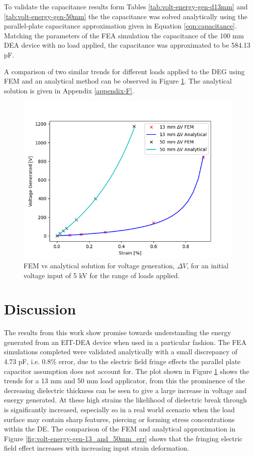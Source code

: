 To validate the capacitance results form Tables \ref{tab:volt-energy-gen-d13mm} and \ref{tab:volt-energy-gen-50mm} the the capacitance was solved analytically using the parallel-plate capacitance approximation given in Equation \ref{eqn:capacitance}. Matching the parameters of the FEA simulation the capacitance of the 100 mm DEA device with no load applied, the capacitance was approximated to be 584.13 pF.

A comparison of two similar trends for different loads applied to the DEG using FEM and an analytical method can be observed in Figure \ref{fig:volt-energy-gen-13_and_50mm}. The analytical solution is given in Appendix \ref{appendix-F}.

\begin{figure}[H]
	\centering
	\includegraphics[width=0.65\linewidth]{Figures/plot_DEG_strain_vs_Vgen_FEM_vs_analytical.png}
	\caption{FEM vs analytical solution for voltage generation, $\Delta V$, for an initial voltage input of 5 kV for the range of loads applied.}
	\label{fig:volt-energy-gen-13_and_50mm}
\end{figure}


\section{Discussion}
\label{sec:discussion}
The results from this work show promise towards understanding the energy generated from an EIT-DEA device when used in a particular fashion. The FEA simulations completed were validated analytically with a small discrepancy of 4.73 pF, i.e. 0.8\% error, due to the electric field fringe effects the parallel plate capacitor assumption does not account for. The plot shown in Figure \ref{fig:volt-energy-gen-13_and_50mm} shows the trends for a 13 mm and 50 mm load applicator, from this the prominence of the decreasing dielectric thickness can be seen to give a large increase in voltage and energy generated. At these high strains the likelihood of dielectric break through is significantly increased, especially so in a real world scenario when the load surface may contain sharp features, piercing or forming stress concentrations within the DE. The comparison of the FEM and analytical approximation in Figure \ref{fig:volt-energy-gen-13_and_50mm_err} shows that the fringing electric field effect increases with increasing input strain deformation.

